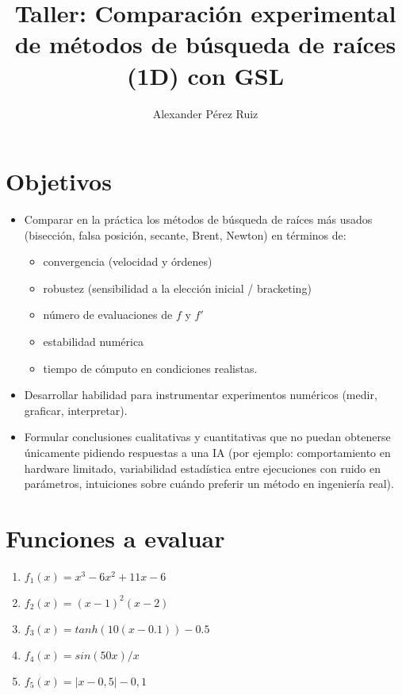 \documentclass[spanish,10pt,letterpaper]{article}
\title{Taller: Comparación experimental de métodos de búsqueda de raíces (1D) con GSL}
\author{Alexander Pérez Ruiz}
\begin{document}
	\maketitle
	
	\section{Objetivos }
	
	\begin{itemize}
		\item Comparar en la práctica los métodos de búsqueda de raíces más usados (bisección, falsa posición, secante, Brent, Newton) en términos de:
		\begin{itemize}
			\item convergencia (velocidad y órdenes)
			\item robustez (sensibilidad a la elección inicial / bracketing)
			\item número de evaluaciones de $f$ y $f'$
			\item estabilidad numérica
			\item tiempo de cómputo en condiciones realistas.
		\end{itemize}
	
	\item Desarrollar habilidad para instrumentar experimentos numéricos (medir, graficar, interpretar).
	
	\item Formular conclusiones cualitativas y cuantitativas que no puedan obtenerse únicamente pidiendo respuestas a una IA (por ejemplo: comportamiento en hardware limitado, variabilidad estadística entre ejecuciones con ruido en parámetros, intuiciones sobre cuándo preferir un método en ingeniería real).
\end{itemize}
\section{Funciones a evaluar}
\begin{enumerate}
	\item $f_1(x)=x^3-6x^2+11x-6$
	\item $f_2(x)=(x-1)^2(x-2)$
	\item $f_3(x)=tanh(10(x-0.1))-0.5$
	\item $f_4(x)=sin(50x)/x$
	\item $f_5(x)=|x-0,5|-0,1$
\end{enumerate}
\end{document}
